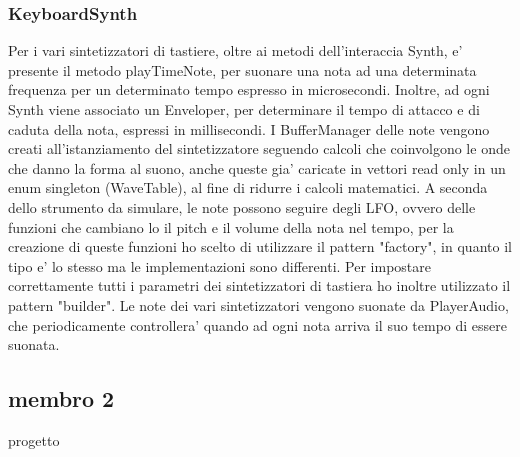 \documentclass[a4paper,12pt]{report}
\begin{document}
\subsubsection{KeyboardSynth}
Per i vari sintetizzatori di tastiere, oltre ai metodi dell'interaccia Synth, e' presente il metodo playTimeNote, per suonare una nota ad una determinata frequenza per un determinato tempo espresso in microsecondi. Inoltre, ad ogni Synth viene associato un Enveloper, per determinare il tempo di attacco e di caduta della nota, espressi in millisecondi. I BufferManager delle note vengono creati all'istanziamento del sintetizzatore seguendo calcoli che coinvolgono le onde che danno la forma al suono, anche queste gia' caricate in vettori read only in un enum singleton (WaveTable), al fine di ridurre i calcoli matematici.
A seconda dello strumento da simulare, le note possono seguire degli LFO, ovvero delle funzioni che cambiano lo il pitch e il volume della nota nel tempo, per la creazione di queste funzioni ho scelto di utilizzare il pattern "factory", in quanto il tipo e' lo stesso ma le implementazioni sono differenti.
Per impostare correttamente tutti i parametri dei sintetizzatori di tastiera ho inoltre utilizzato il pattern "builder".
Le note dei vari sintetizzatori vengono suonate da PlayerAudio, che periodicamente controllera' quando ad ogni nota arriva il suo tempo di essere suonata.
\newpage
\subsection{membro 2}
progetto 
\newpage
\end{document}
